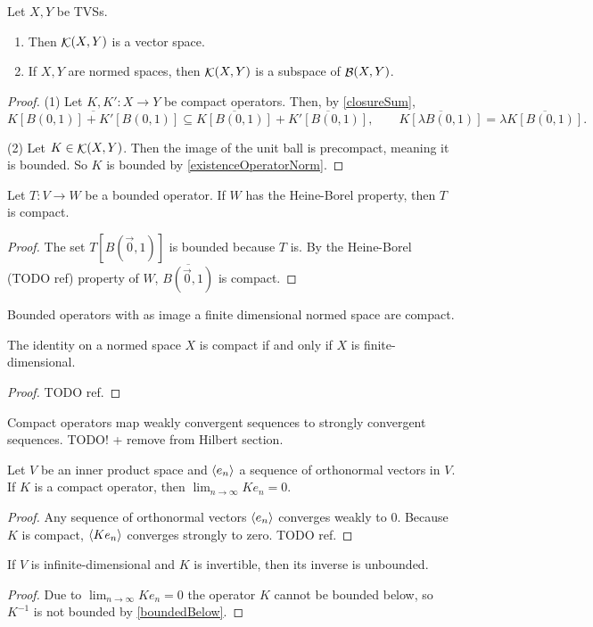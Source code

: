 \begin{lemma}
Let $X,Y$ be TVSs.
\begin{enumerate}
\item Then $\mathop{\mathcal{K}}(X, Y)$ is a vector space.
\item If $X,Y$ are normed spaces, then $\mathop{\mathcal{K}}(X, Y)$ is a subspace of $\mathop{\mathcal{B}}(X, Y)$.
\end{enumerate}
\end{lemma}
\begin{proof}
(1) Let $K,K':X\to Y$ be compact operators. Then, by \ref{closureSum},
\[ \overline{K[B(0, 1)]+K'[B(0, 1)]} \subseteq \overline{K[B(0, 1)]}+\overline{K'[B(0, 1)]}, \qquad \overline{K[\lambda B(0, 1)]} = \lambda\overline{K[B(0, 1)]}. \]

(2) Let $K\in\mathop{\mathcal{K}}(X, Y)$. Then the image of the unit ball is precompact, meaning it is bounded. So $K$ is bounded by \ref{existenceOperatorNorm}.
\end{proof}

\begin{lemma}
Let $T:V\to W$ be a bounded operator. If $W$ has the Heine-Borel property, then $T$ is compact.
\end{lemma}
\begin{proof}
The set $T[B(\vec{0},1)]$ is bounded because $T$ is. By the Heine-Borel (TODO ref) property of $W$, $\overline{B(\vec{0},1)}$ is compact.
\end{proof}
\begin{corollary}
Bounded operators with as image a finite dimensional normed space are compact.
\end{corollary}
\begin{corollary}
The identity on a normed space $X$ is compact \textup{if and only if} $X$ is finite-dimensional.
\end{corollary}
\begin{proof}
TODO ref. 
\end{proof}

\begin{proposition}
Compact operators map weakly convergent sequences to strongly convergent sequences. TODO! + remove from Hilbert section.
\end{proposition}
\begin{corollary} \label{limitCompactImageOrthonormalSequence}
Let $V$ be an inner product space and $\left\langle e_n \right\rangle$ a sequence of orthonormal vectors in $V$. If $K$ is a compact operator, then $\lim_{n\to\infty}Ke_n = 0$.
\end{corollary}
\begin{proof}
Any sequence of orthonormal vectors $\left\langle e_n \right\rangle$ converges weakly to $0$. Because $K$ is compact, $\left\langle Ke_n \right\rangle$ converges strongly to zero. TODO ref.
\end{proof}
\begin{corollary}
If $V$ is infinite-dimensional and $K$ is invertible, then its inverse is unbounded.
\end{corollary}
\begin{proof}
Due to $\lim_{n\to\infty}Ke_n = 0$ the operator $K$ cannot be bounded below, so $K^{-1}$ is not bounded by \ref{boundedBelow}.
\end{proof}

